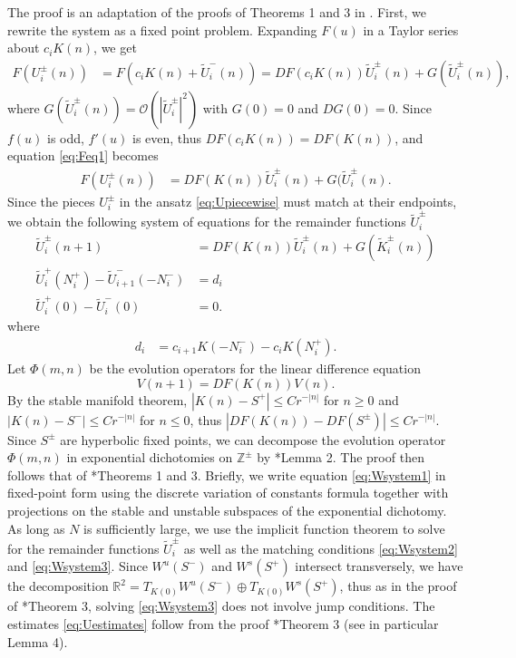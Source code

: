 \documentclass[12pt]{article}
\def\R{{\mathbb R}}
\def\Z{{\mathbb Z}}
\begin{document}
The proof is an adaptation of the proofs of Theorems 1 and 3 in \cite{Parker2020}. First, we rewrite the system as a fixed point problem. Expanding $F(u)$ in a Taylor series about $c_i K(n)$, we get
\begin{align}\label{eq:Feq1}
F(U_i^\pm(n)) &= F(c_i K(n) + \tilde{U}_i^-(n)) = 
D F(c_i K(n)) \tilde{U}_i^\pm(n) + G(\tilde{U}_i^\pm(n)),
\end{align}
where $G(\tilde{U}_i^\pm(n)) = \mathcal{O}(|\tilde{U}_i^\pm|^2)$ with $G(0) = 0$ and $DG(0) = 0$. Since $f(u)$ is odd, $f'(u)$ is even, thus $D F(c_i K(n)) = D F(K(n))$, and equation \cref{eq:Feq1} becomes
\begin{align}\label{eq:Feq1}
F(U_i^\pm(n)) &= 
D F(K(n)) \tilde{U}_i^\pm(n) + G(\tilde{U}_i^\pm(n).
\end{align}
Since the pieces $U_i^\pm$ in the ansatz \cref{eq:Upiecewise} must match at their endpoints, we obtain the following system of equations for the remainder functions $\tilde{U}_i^\pm$
\begin{align}
\tilde{U}_i^\pm(n+1) &= D F(K(n)) \tilde{U}_i^\pm(n) + G(\tilde{K}_i^\pm(n)) \label{eq:Wsystem1} \\
\tilde{U}_i^+(N_i^+) - \tilde{U}_{i+1}^-(-N_i^-) &= d_i \label{eq:Wsystem2} \\
\tilde{U}_i^+(0) - \tilde{U}_i^-(0) &= 0. \label{eq:Wsystem3}
\end{align}
where
\begin{align}\label{didef}
	d_i &= c_{i+1} K(-N_i^-) - c_i K(N_i^+).
\end{align}
Let $\Phi(m, n)$ be the evolution operators for the linear difference equation 
\[
V(n+1) = D F(K(n)) V(n).
\]
By the stable manifold theorem, $|K(n) - S^+| \leq C r^{-|n|}$ for $n \geq 0$ and $|K(n) - S^-| \leq C r^{-|n|}$ for $n \leq 0$, thus $| DF(K(n)) - DF(S^\pm)| \leq C r^{-|n|}$. Since $S^\pm$ are hyperbolic fixed points, we can decompose the evolution operator $\Phi(m, n)$ in exponential dichotomies on $\Z^\pm$ by \cite{Parker2020}*{Lemma 2}. The proof then follows that of \cite{Parker2020}*{Theorems 1 and 3}. Briefly, we write equation \cref{eq:Wsystem1} in fixed-point form using the discrete variation of constants formula together with projections on the stable and unstable subspaces of the exponential dichotomy. As long as $N$ is sufficiently large, we use the implicit function theorem to solve for the remainder functions $\tilde{U}_i^\pm$ as well as the matching conditions \cref{eq:Wsystem2} and \cref{eq:Wsystem3}. Since $W^u(S^-)$ and $W^s(S^+)$ intersect transversely, we have the decomposition $\R^2 = T_{K(0)}W^u(S^-)\oplus T_{K(0)}W^s(S^+)$, thus as in the proof of \cite{Parker2020}*{Theorem 3}, solving \cref{eq:Wsystem3} does not involve jump conditions. The estimates \cref{eq:Uestimates} follow from the proof \cite{Parker2020}*{Theorem 3} (see in particular Lemma 4).
\end{document}
